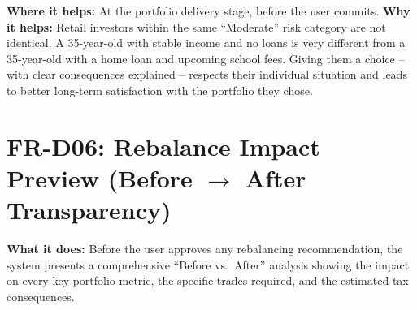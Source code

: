 \documentclass[12pt, a4paper, openany, oneside]{report}
\begin{document}
\begin{valuebox}
\textbf{Where it helps:} At the portfolio delivery stage, before the user commits. \textbf{Why it helps:} Retail investors within the same ``Moderate'' risk category are not identical. A 35-year-old with stable income and no loans is very different from a 35-year-old with a home loan and upcoming school fees. Giving them a choice -- with clear consequences explained -- respects their individual situation and leads to better long-term satisfaction with the portfolio they chose.
\end{valuebox}

\section{FR-D06: Rebalance Impact Preview (Before $\rightarrow$ After Transparency)}

\textbf{What it does:} Before the user approves any rebalancing recommendation, the system presents a comprehensive ``Before vs.\ After'' analysis showing the impact on every key portfolio metric, the specific trades required, and the estimated tax consequences.
\end{document}
